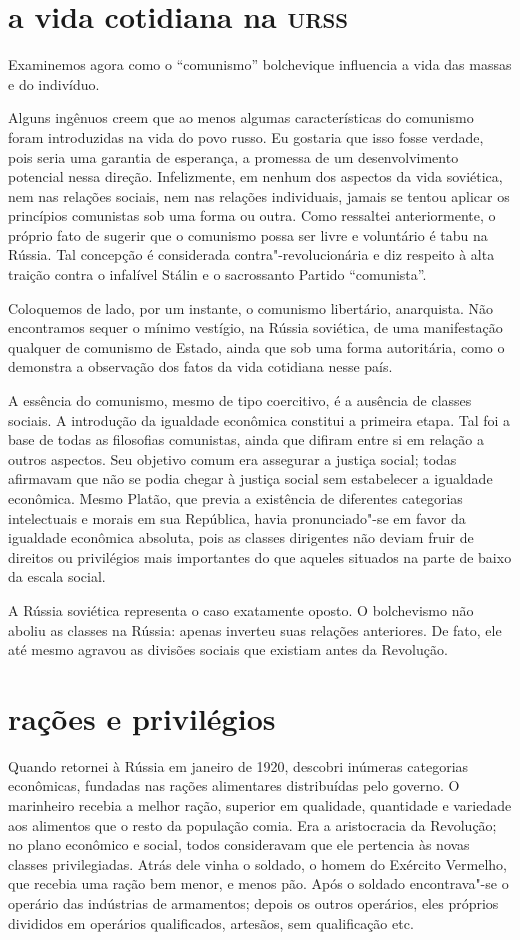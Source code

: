 \section*{a vida cotidiana na \textsc{urss}} 
Examinemos agora como o “comunismo” bolchevique influencia a vida das
massas e do indivíduo.

Alguns ingênuos creem que ao menos algumas características do comunismo
foram introduzidas na vida do povo russo. Eu gostaria que isso fosse
verdade, pois seria uma garantia de esperança, a promessa de um
desenvolvimento potencial nessa direção. Infelizmente, em nenhum dos
aspectos da vida soviética, nem nas relações sociais, nem nas relações
individuais, jamais se tentou aplicar os princípios comunistas sob uma
forma ou outra. Como ressaltei anteriormente, o próprio fato de sugerir
que o comunismo possa ser livre e voluntário é tabu na Rússia. Tal
concepção é considerada contra"-revolucionária e diz respeito à
alta traição contra o infalível Stálin e o sacrossanto Partido
“comunista”.

Coloquemos de lado, por um instante, o comunismo libertário, anarquista.
Não encontramos sequer o mínimo vestígio, na Rússia soviética, de
uma manifestação qualquer de comunismo de Estado, ainda que sob uma
forma autoritária, como o demonstra a observação dos fatos da vida
cotidiana nesse país.

A essência do comunismo, mesmo de tipo coercitivo, é a ausência de
classes sociais. A introdução da igualdade econômica constitui a
primeira etapa. Tal foi a base de todas as filosofias comunistas, ainda
que difiram entre si em relação a outros aspectos. Seu objetivo comum
era assegurar a justiça social; todas afirmavam que não se podia chegar
à justiça social sem estabelecer a igualdade econômica. Mesmo Platão,
que previa a existência de diferentes categorias intelectuais e morais
em sua República, havia pronunciado"-se em favor da igualdade
econômica absoluta, pois as classes dirigentes não deviam fruir de
direitos ou privilégios mais importantes do que aqueles situados
na parte de baixo da escala social.

A Rússia soviética representa o caso exatamente oposto. O bolchevismo
não aboliu as classes na Rússia: apenas inverteu suas relações
anteriores. De fato, ele até mesmo agravou as divisões sociais que
existiam antes da Revolução.

\section*{rações e privilégios}
Quando retornei à Rússia em janeiro de 1920, descobri inúmeras
categorias econômicas, fundadas nas rações alimentares distribuídas
pelo governo. O marinheiro recebia a melhor ração, superior em
qualidade, quantidade e variedade aos alimentos que o resto da
população comia. Era a aristocracia da Revolução; no plano econômico e
social, todos consideravam que ele pertencia às novas classes
privilegiadas. Atrás dele vinha o soldado, o homem do Exército
Vermelho, que recebia uma ração bem menor, e menos pão. Após o soldado
encontrava"-se o operário das indústrias de armamentos;
depois os outros operários, eles próprios divididos em operários
qualificados, artesãos, sem qualificação etc.

